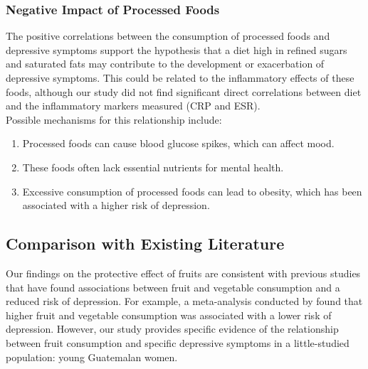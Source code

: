 \documentclass[jou]{apa7}
\begin{document}
\subsubsection{Negative Impact of Processed Foods}\label{impacto-negativo-de-alimentos-procesados}

The positive correlations between the consumption of processed foods and depressive symptoms support the hypothesis that a diet high in refined sugars and saturated fats may contribute to the development or exacerbation of depressive symptoms. This could be related to the inflammatory effects of these foods, although our study did not find significant direct correlations between diet and the inflammatory markers measured (CRP and ESR).\\

Possible mechanisms for this relationship include:

\begin{enumerate}
	\item Processed foods can cause blood glucose spikes, which can affect mood.
	\item These foods often lack essential nutrients for mental health.
	\item Excessive consumption of processed foods can lead to obesity, which has been associated with a higher risk of depression.
\end{enumerate}


	\subsection{Comparison with Existing Literature}\label{comparaciuxf3n-con-literatura-existente}

	Our findings on the protective effect of fruits are consistent with previous studies that have found associations between fruit and vegetable consumption and a reduced risk of depression. For example, a meta-analysis conducted by \parencite{liuFruitVegetableConsumption2016} found that higher fruit and vegetable consumption was associated with a lower risk of depression. However, our study provides specific evidence of the relationship between fruit consumption and specific depressive symptoms in a little-studied population: young Guatemalan women.\\
\end{document}
